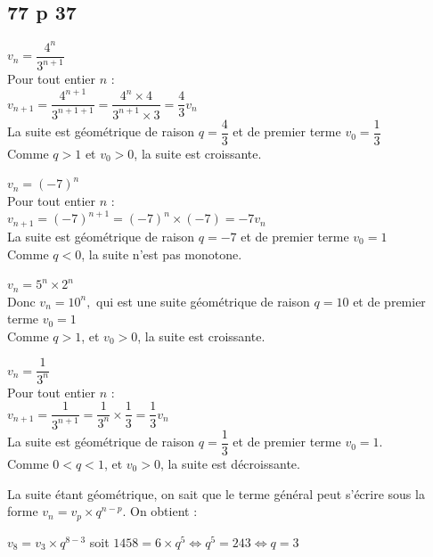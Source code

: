 \documentclass[a4paper,french]{book}
\begin{document}
\subsection*{77 p 37}
\begin{enumMet}
    \item \begin{enumMet}
        \item $v_{n}=\dfrac{4^{n}}{3^{n+1}}$\\
        Pour tout entier $n$ :\\
        $v_{n+1}=\dfrac{4^{n+1}}{3^{n+1+1}}=\dfrac{4^{n} \times 4}{3^{n+1} \times 3}=\dfrac{4}{3} v_{n}$\\
        La suite est géométrique de raison $q=\dfrac{4}{3}$ et de premier terme $v_{0}=\dfrac{1}{3}$\\
        Comme $q>1$ et $v_{0}>0$, la suite est croissante.
        \item $v_{n}=(-7)^{n}$\\
        Pour tout entier $n$ :\\
        $v_{n+1}=(-7)^{n+1}=(-7)^{n} \times(-7)=-7 v_{n}$\\
        La suite est géométrique de raison $q=-7$ et de premier terme $v_{0}=1$\\
        Comme $q<0$, la suite n'est pas monotone.\\
        \item $v_{n}=5^{n} \times 2^{n}$\\
        Donc $v_{n}=10^{n},$ qui est une suite géométrique de raison $q=10$ et de premier terme $v_{0}=1$\\
        Comme $q>1$, et $v_{0}>0$, la suite est croissante.
        \item $v_{n}=\dfrac{1}{3^{n}}$\\
        Pour tout entier $n$ :\\
        $v_{n+1}=\dfrac{1}{3^{n+1}}=\dfrac{1}{3^{n}} \times \dfrac{1}{3}=\dfrac{1}{3} v_{n}$\\
        La suite est géométrique de raison $q=\dfrac{1}{3}$ et de premier terme $v_{0}=1$.\\
        Comme $0<q<1$, et $v_{0}>0$, la suite est décroissante.
    \end{enumMet}
    \item La suite étant géométrique, on sait que le terme général peut s'écrire sous la forme $v_{n}=v_{p} \times q^{n-p}$. On obtient :
    \begin{enumMet}
        \item $v_{8}=v_{3} \times q^{8-3}$ soit $1458=6 \times q^{5} \Longleftrightarrow q^{5}=243 \Longleftrightarrow q=3$\\

\end{enumMet}
\end{enumMet}
\end{document}
